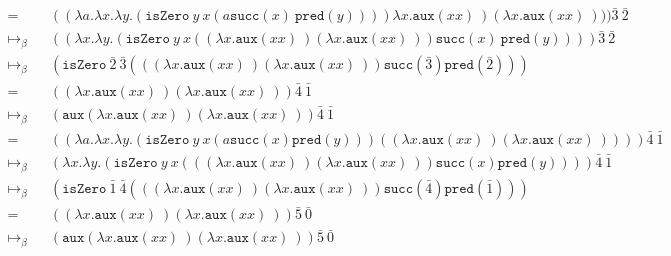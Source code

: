 \documentclass[11pt]{article}
\begin{document}
\begin{enumerate}
\begin{align*}
		      =             &  & (( \lambda a. \lambda x. \lambda y. ( \texttt{isZero} \: y \: x (a \texttt{succ}(x) \: \texttt{pred}(y)))) \lambda x. \texttt{aux}(x x) \:)( \lambda x. \texttt{aux}(x x) \:))) \bar{3} \: \bar{2} & \\
		      \mapsto_\beta &  & (( \lambda x. \lambda y. ( \texttt{isZero} \: y \: x (( \lambda x. \texttt{aux}(x x) \:)( \lambda x. \texttt{aux}(x x) \:)) \texttt{succ}(x)	\: \texttt{pred}(y)))) \bar{3} \: \bar{2}              & \\
		      \mapsto_\beta &  & ( \texttt{isZero} \: \bar{2} \: \bar{3} ((( \lambda x. \texttt{aux}(x x) \:)( \lambda x. \texttt{aux}(x x) \:)) \texttt{succ}( \bar{3} )	\texttt{pred}( \bar{2} )))                                 & \\
		      =             &  & (( \lambda x. \texttt{aux}(x x) \:)( \lambda x. \texttt{aux}(x x) \:)) \bar{4} \: \bar{1}                                                                                                          & \\
		      \mapsto_\beta &  & ( \texttt{aux}( \lambda x. \texttt{aux}(x x) \:)( \lambda x. \texttt{aux}(x x) \:)) \bar{4} \: \bar{1}                                                                                             & \\
		      =             &  & (( \lambda a. \lambda x. \lambda y. ( \texttt{isZero} \: y \: x (a \texttt{succ}(x) \texttt{pred}(y)))(( \lambda x. \texttt{aux}(x x) \:)( \lambda x. \texttt{aux}(x x) \:)))) \bar{4} \: \bar{1}  & \\
		      \mapsto_\beta &  & ( \lambda x. \lambda y. ( \texttt{isZero} \: y \: x ((( \lambda x. \texttt{aux}(x x) \:)( \lambda x. \texttt{aux}(x x) \:)) \texttt{succ}(x) \texttt{pred}(y)))) \bar{4} \: \bar{1}                & \\
		      \mapsto_\beta &  & ( \texttt{isZero} \: \bar{1} \: \bar{4} ((( \lambda x. \texttt{aux}(x x) \:)( \lambda x. \texttt{aux}(x x) \:)) \texttt{succ}( \bar{4} ) \texttt{pred}( \bar{1} )))                                & \\
		      =             &  & (( \lambda x. \texttt{aux}(x x) \:)( \lambda x. \texttt{aux}(x x) \:)) \bar{5} \: \bar{0}                                                                                                          & \\
		      \mapsto_\beta &  & ( \texttt{aux}( \lambda x. \texttt{aux}(x x) \:)( \lambda x. \texttt{aux}(x x) \:)) \bar{5} \: \bar{0}                                                                                             & \\

\end{align*}
\end{enumerate}
\end{document}
